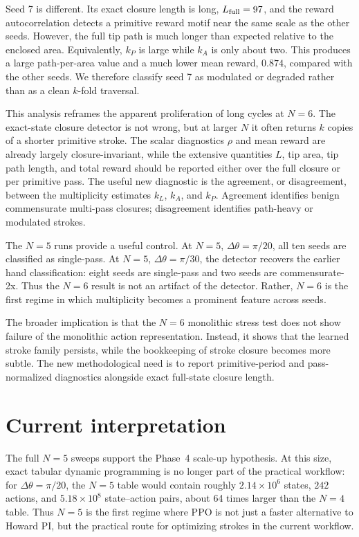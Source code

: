 \documentclass[11pt]{article}
\begin{document}
Seed 7 is different. Its exact closure length is long, $L_{\rm full}=97$, and the reward autocorrelation detects a primitive reward motif near the same scale as the other seeds. However, the full tip path is much longer than expected relative to the enclosed area. Equivalently, $k_P$ is large while $k_A$ is only about two. This produces a large path-per-area value and a much lower mean reward, $0.874$, compared with the other seeds. We therefore classify seed 7 as modulated or degraded rather than as a clean $k$-fold traversal.

This analysis reframes the apparent proliferation of long cycles at $N=6$. The exact-state closure detector is not wrong, but at larger $N$ it often returns $k$ copies of a shorter primitive stroke. The scalar diagnostics $\rho$ and mean reward are already largely closure-invariant, while the extensive quantities $L$, tip area, tip path length, and total reward should be reported either over the full closure or per primitive pass. The useful new diagnostic is the agreement, or disagreement, between the multiplicity estimates $k_L$, $k_A$, and $k_P$. Agreement identifies benign commensurate multi-pass closures; disagreement identifies path-heavy or modulated strokes.

The $N=5$ runs provide a useful control. At $N=5$, $\Delta\theta=\pi/20$, all ten seeds are classified as single-pass. At $N=5$, $\Delta\theta=\pi/30$, the detector recovers the earlier hand classification: eight seeds are single-pass and two seeds are commensurate-2x. Thus the $N=6$ result is not an artifact of the detector. Rather, $N=6$ is the first regime in which multiplicity becomes a prominent feature across seeds.

The broader implication is that the $N=6$ monolithic stress test does not show failure of the monolithic action representation. Instead, it shows that the learned stroke family persists, while the bookkeeping of stroke closure becomes more subtle. The new methodological need is to report primitive-period and pass-normalized diagnostics alongside exact full-state closure length.



\section{Current interpretation}

The full $N=5$ sweeps support the Phase~4 scale-up hypothesis. At this size,
exact tabular dynamic programming is no longer part of the practical workflow:
for $\Delta\theta=\pi/20$, the $N=5$ table would contain roughly
$2.14\times 10^6$ states, $242$ actions, and $5.18\times 10^8$ state--action
pairs, about 64 times larger than the $N=4$ table. Thus $N=5$ is the first
regime where PPO is not just a faster alternative to Howard PI, but the
practical route for optimizing strokes in the current workflow.
\end{document}
